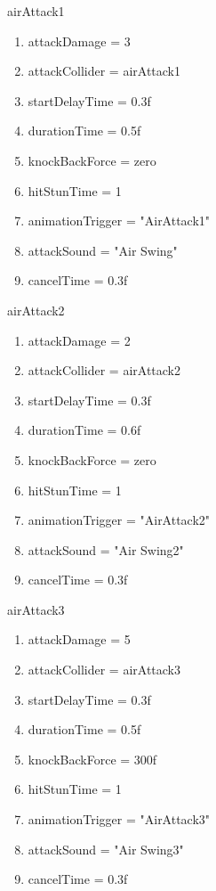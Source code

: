 \documentclass{article}
\begin{document}
        airAttack1  
        \begin{enumerate} 	 
        	\item attackDamage = 3
        	\item attackCollider = airAttack1 
        	\item startDelayTime  = 0.3f
        	\item durationTime = 0.5f
        	\item knockBackForce = zero
        	\item hitStunTime = 1
        	\item animationTrigger = "AirAttack1"
        	\item attackSound = "Air Swing"
        	\item cancelTime = 0.3f
        \end{enumerate} 
                airAttack2  
                \begin{enumerate} 	 
                	\item attackDamage = 2
                	\item attackCollider = airAttack2 
                	\item startDelayTime  = 0.3f
                	\item durationTime = 0.6f
                	\item knockBackForce = zero
                	\item hitStunTime = 1
                	\item animationTrigger = "AirAttack2"
                	\item attackSound = "Air Swing2"
                	\item cancelTime = 0.3f
                \end{enumerate} 
        airAttack3 
         \begin{enumerate} 	 
        	\item attackDamage = 5
        	\item attackCollider = airAttack3 
        	\item startDelayTime  = 0.3f
        	\item durationTime = 0.5f
        	\item knockBackForce = 300f
        	\item hitStunTime = 1
        	\item animationTrigger = "AirAttack3"
        	\item attackSound = "Air Swing3"
        	\item cancelTime = 0.3f
        	\end{enumerate} 
\end{document}

